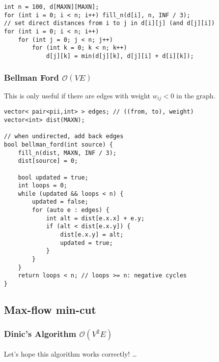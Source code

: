 \documentclass{article}
\begin{document}
\begin{lstlisting}
int n = 100, d[MAXN][MAXN];
for (int i = 0; i < n; i++) fill_n(d[i], n, INF / 3);
// set direct distances from i to j in d[i][j] (and d[j][i])
for (int i = 0; i < n; i++)
	for (int j = 0; j < n; j++)
		for (int k = 0; k < n; k++)
			d[j][k] = min(d[j][k], d[j][i] + d[i][k]);
\end{lstlisting}

\subsubsection{Bellman Ford $\mathcal{O}(V E)$}

This is only useful if there are edges with weight $w_{i j} < 0$ in the graph.

\begin{lstlisting}
vector< pair<pii,int> > edges; // ((from, to), weight)
vector<int> dist(MAXN);

// when undirected, add back edges
bool bellman_ford(int source) {
	fill_n(dist, MAXN, INF / 3);
	dist[source] = 0;
	
	bool updated = true;
	int loops = 0;
	while (updated && loops < n) {
		updated = false;
		for (auto e : edges) {
			int alt = dist[e.x.x] + e.y;
			if (alt < dist[e.x.y]) {
				dist[e.x.y] = alt;
				updated = true;
			}
		}
	}
	return loops < n; // loops >= n: negative cycles
}
\end{lstlisting}

\subsection{Max-flow min-cut}
\subsubsection{Dinic's Algorithm $\mathcal{O}(V^{2} E)$}

Let's hope this algorithm works correctly! \dots
\end{document}
